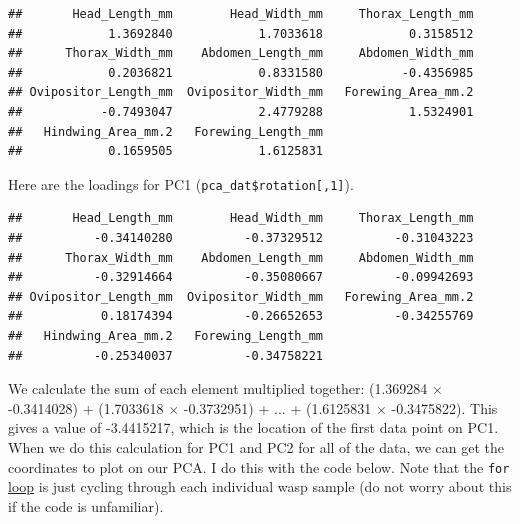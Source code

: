 \documentclass[]{article}
\begin{document}
\begin{verbatim}
##       Head_Length_mm        Head_Width_mm     Thorax_Length_mm 
##            1.3692840            1.7033618            0.3158512 
##      Thorax_Width_mm    Abdomen_Length_mm     Abdomen_Width_mm 
##            0.2036821            0.8331580           -0.4356985 
## Ovipositor_Length_mm  Ovipositor_Width_mm   Forewing_Area_mm.2 
##           -0.7493047            2.4779288            1.5324901 
##   Hindwing_Area_mm.2   Forewing_Length_mm 
##            0.1659505            1.6125831
\end{verbatim}

Here are the loadings for PC1 (\texttt{pca\_dat\$rotation{[},1{]}}).

\begin{verbatim}
##       Head_Length_mm        Head_Width_mm     Thorax_Length_mm 
##          -0.34140280          -0.37329512          -0.31043223 
##      Thorax_Width_mm    Abdomen_Length_mm     Abdomen_Width_mm 
##          -0.32914664          -0.35080667          -0.09942693 
## Ovipositor_Length_mm  Ovipositor_Width_mm   Forewing_Area_mm.2 
##           0.18174394          -0.26652653          -0.34255769 
##   Hindwing_Area_mm.2   Forewing_Length_mm 
##          -0.25340037          -0.34758221
\end{verbatim}

We calculate the sum of each element multiplied together: (1.369284
\(\times\) -0.3414028) + (1.7033618 \(\times\) -0.3732951) + \(...\) +
(1.6125831 \(\times\) -0.3475822). This gives a value of -3.4415217,
which is the location of the first data point on PC1. When we do this
calculation for PC1 and PC2 for all of the data, we can get the
coordinates to plot on our PCA. I do this with the code below. Note that
the \texttt{for}
\href{https://stirlingcodingclub.github.io/using_loops/loop_notes.html}{loop}
is just cycling through each individual wasp sample (do not worry about
this if the code is unfamiliar).
\end{document}
